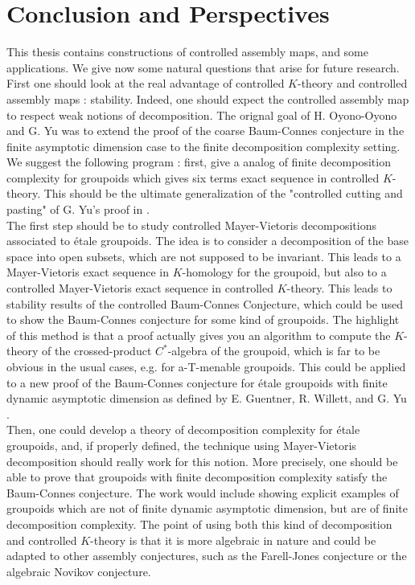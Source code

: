 \chapter{Conclusion and Perspectives}

This thesis contains constructions of controlled assembly maps, and some applications. We give now some natural questions that arise for future research.\\ 

First one should look at the real advantage of controlled $K$-theory and controlled assembly maps : stability. Indeed, one should expect the controlled assembly map to respect weak notions of decomposition. The orignal goal of H. Oyono-Oyono and G. Yu was to extend the proof of the coarse Baum-Connes conjecture in the finite asymptotic dimension case to the finite decomposition complexity setting. We suggest the following program : first, give a analog of finite decomposition complexity for groupoids which gives six terms exact sequence in controlled $K$-theory. This should be the ultimate generalization of the "controlled cutting and pasting" of G. Yu's proof in \cite{Yu1}.\\

The first step should be to study controlled Mayer-Vietoris decompositions associated to étale groupoids. The idea is to consider a decomposition of the base space into open subsets, which are not supposed to be invariant. This leads to a Mayer-Vietoris exact sequence in $K$-homology for the groupoid, but also to a controlled Mayer-Vietoris exact sequence in controlled $K$-theory. This leads to stability results of the controlled Baum-Connes Conjecture, which could be used to show the Baum-Connes conjecture for some kind of groupoids. The highlight of this method is that a proof actually gives you an algorithm to compute the $K$-theory of the crossed-product $C^*$-algebra of the groupoid, which is far to be obvious in the usual cases, e.g. for a-T-menable groupoids. %
This could be applied to a new proof of the Baum-Connes conjecture for étale groupoids with finite dynamic asymptotic dimension as defined by E. Guentner, R. Willett, and G. Yu \cite{GWY}.\\

Then, one could develop a theory of decomposition complexity for étale groupoids, and, if properly defined, the technique using Mayer-Vietoris decomposition should really work for this notion. More precisely, one should be able to prove that groupoids with finite decomposition complexity satisfy the Baum-Connes conjecture. The work would include showing explicit examples of groupoids which are not of finite dynamic asymptotic dimension, but are of finite decomposition complexity. The point of using both this kind of decomposition and controlled $K$-theory is that it is more algebraic in nature and could be adapted to other assembly conjectures, such as the Farell-Jones conjecture or the algebraic Novikov conjecture. \cite{RTY} \\

